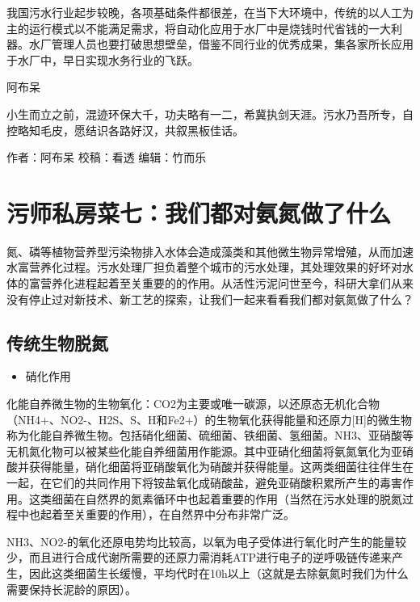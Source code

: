 \documentclass[
]{book}
\providecommand{\tightlist}{%
  \setlength{\itemsep}{0pt}\setlength{\parskip}{0pt}}
\begin{document}
我国污水行业起步较晚，各项基础条件都很差，在当下大环境中，传统的以人工为主的运行模式以不能满足需求，将自动化应用于水厂中是烧钱时代省钱的一大利器。水厂管理人员也要打破思想壁垒，借鉴不同行业的优秀成果，集各家所长应用于水厂中，早日实现水务行业的飞跃。

阿布呆

小生而立之前，混迹环保大千，功夫略有一二，希冀执剑天涯。污水乃吾所专，自控略知毛皮，愿结识各路好汉，共叙黑板佳话。

作者：阿布呆
校稿：看透
编辑：竹而乐

\hypertarget{ux6c61ux5e08ux79c1ux623fux83dcux4e03ux6211ux4eecux90fdux5bf9ux6c28ux6c2eux505aux4e86ux4ec0ux4e48}{%
\section{污师私房菜七：我们都对氨氮做了什么}\label{ux6c61ux5e08ux79c1ux623fux83dcux4e03ux6211ux4eecux90fdux5bf9ux6c28ux6c2eux505aux4e86ux4ec0ux4e48}}

氮、磷等植物营养型污染物排入水体会造成藻类和其他微生物异常增殖，从而加速水富营养化过程。污水处理厂担负着整个城市的污水处理，其处理效果的好坏对水体的富营养化进程起着至关重要的的作用。从活性污泥问世至今，科研大拿们从来没有停止过对新技术、新工艺的探索，让我们一起来看看我们都对氨氮做了什么？

\hypertarget{ux4f20ux7edfux751fux7269ux8131ux6c2e}{%
\subsection{传统生物脱氮}\label{ux4f20ux7edfux751fux7269ux8131ux6c2e}}

\begin{itemize}
\tightlist
\item
  硝化作用
\end{itemize}

化能自养微生物的生物氧化：CO2为主要或唯一碳源，以还原态无机化合物（NH4+、NO2-、H2S、S、H和Fe2+）的生物氧化获得能量和还原力{[}H{]}的微生物称为化能自养微生物。包括硝化细菌、硫细菌、铁细菌、氢细菌。NH3、亚硝酸等无机氮化物可以被某些化能自养细菌用作能源。其中亚硝化细菌将氨氮氧化为亚硝酸并获得能量，硝化细菌将亚硝酸氧化为硝酸并获得能量。这两类细菌往往伴生在一起，在它们的共同作用下将铵盐氧化成硝酸盐，避免亚硝酸积累所产生的毒害作用。这类细菌在自然界的氮素循环中也起着重要的作用（当然在污水处理的脱氮过程中也起着至关重要的作用），在自然界中分布非常广泛。

NH3、NO2-的氧化还原电势均比较高，以氧为电子受体进行氧化时产生的能量较少，而且进行合成代谢所需要的还原力需消耗ATP进行电子的逆呼吸链传递来产生，因此这类细菌生长缓慢，平均代时在10h以上（这就是去除氨氮时我们为什么需要保持长泥龄的原因）。
\end{document}
